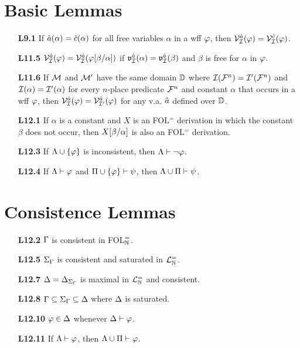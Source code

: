 \documentclass[a4paper, 11pt]{article} %
\begin{document}
\section*{Basic Lemmas}

\begin{itemize}
  \item[\bf L9.1] If $\hat{a}(\alpha)=\hat{c}(\alpha)$ for all free variables $\alpha$ in a wff $\varphi$, then $\mathcal{V}_{\mathcal{I}}^{\hat{a}}(\varphi)=\mathcal{V}_{\mathcal{I}}^{\hat{c}}(\varphi)$.
  \item[\bf L11.5] $\mathcal{V}_{\mathcal{I}}^{\hat{a}}(\varphi)=\mathcal{V}_{\mathcal{I}}^{\hat{a}}(\varphi[\beta/\alpha])$ if $\mathfrak{v}_{\mathcal{I}}^{\hat{a}}(\alpha)=\mathfrak{v}_{\mathcal{I}}^{\hat{a}}(\beta)$ and $\beta$ is free for $\alpha$ in $\varphi$.
  \item[\bf L11.6] If $\mathcal{M}$ and $\mathcal{M}'$ have the same domain $\mathbb{D}$ where $\mathcal{I}(\mathcal{F}^n)=\mathcal{I}'(\mathcal{F}^n)$ and $\mathcal{I}(\alpha)=\mathcal{I}'(\alpha)$ for every $n$-place predicate $\mathcal{F}^n$ and constant $\alpha$ that occurs in a wff $\varphi$, then $\mathcal{V}_{\mathcal{I}}^{\hat{a}}(\varphi)=\mathcal{V}_{\mathcal{I}'}^{\hat{a}}(\varphi)$ for any v.a. $\hat{a}$ defined over $\mathbb{D}$.
  \item[\bf L12.1] If $\alpha$ is a constant and $X$ is an FOL$^=$ derivation in which the constant $\beta$ does not occur, then $X[\beta/\alpha]$ is also an FOL$^=$ derivation.
  \item[\bf L12.3] If $\Lambda\cup\lbrace\varphi\rbrace$ is inconsistent, then $\Lambda\vdash\neg\varphi$.
  \item[\bf L12.4] If $\Lambda \vdash \varphi$ and $\Pi\cup\lbrace\varphi\rbrace \vdash \psi$, then $\Lambda\cup\Pi \vdash \psi$.
\end{itemize}


\section*{Consistence Lemmas}%
  
\begin{itemize}
  \item[\bf L12.2] $\Gamma$ is consistent in FOL$^=_{\mathbb{N}}$.
  \item[\bf L12.5] $\Sigma_{\Gamma}$ is consistent and saturated in $\mathcal{L}^{=}_{\mathbb{N}}$.
  \item[\bf L12.7] $\Delta=\Delta_{\Sigma_{\Gamma}}$ is maximal in $\mathcal{L}^{=}_{\mathbb{N}}$ and consistent. 
  \item[\bf L12.8] $\Gamma\subseteq\Sigma_{\Gamma}\subseteq\Delta$ where $\Delta$ is saturated.
  \item[\bf L12.10] $\varphi\in\Delta$ whenever $\Delta\vdash\varphi$.
  \item[\bf L12.11] If $\Lambda\vdash\varphi$, then $\Lambda\cup\Pi\vdash\varphi$.
\end{itemize}
\end{document}
